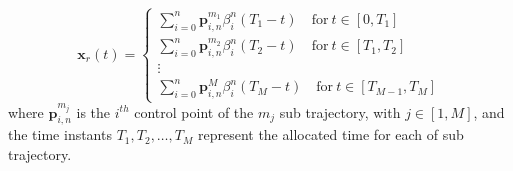 


\begin{equation}
\mathbf{x}_{r}(t)  = 
\begin{cases} 
    \sum_{i=0}^{n}\mathbf{p}_{i,n}^{m_1}\beta_i^n(T_1 - t) \quad \text{for} \ t\in [0, T_1]\\
    \sum_{i=0}^{n}\mathbf{p}_{i,n}^{m_2}\beta_i^n(T_2 - t) \quad \text{for} \ t\in [T_1, T_2] \\
    \vdots \\ 
    \sum_{i=0}^{n}\mathbf{p}_{i,n}^{M}\beta_i^n(T_{M}-t) \quad \text{for} \ t\in [T_{M-1}, T_M]
\end{cases}
\label{eq:piecewise_bernstein_equation}
\end{equation}
where $\mathbf{p}_{i,n}^{m_j}$ is the $i^{th}$ control point of the $m_j$ sub trajectory, with $j \in [1, M]$, and the time instants $T_1, T_2, \dots, T_M$ represent the allocated time for each of sub trajectory. 



